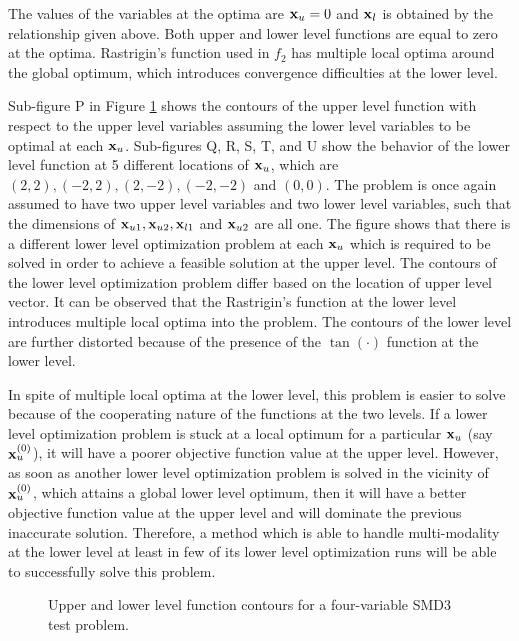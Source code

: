 \documentclass[twoside]{article}
\begin{document}
The values of the variables at the optima are $\mbox{$\mathbf{x}$}_u=0$ and $\mbox{$\mathbf{x}$}_l$ is obtained by the relationship given above. Both upper and lower level functions are equal to zero at the optima. Rastrigin's function used in $f_2$ has multiple local optima around the global optimum, which introduces convergence difficulties at the lower level.

Sub-figure P in Figure \ref{fig:smd3} shows the contours of the upper level function with respect to the upper level variables assuming the lower level variables to be optimal at each $\mbox{$\mathbf{x}$}_u$. Sub-figures Q, R, S, T, and U show the behavior of the lower level function at 5 different locations of $\mbox{$\mathbf{x}$}_u$, which are $(2,2), (-2,2), (2,-2), (-2,-2)$ and $(0,0)$. The problem is once again assumed to have two upper level variables and two lower level variables, such that the dimensions of $\mbox{$\mathbf{x}$}_{u1}, \mbox{$\mathbf{x}$}_{u2}, \mbox{$\mathbf{x}$}_{l1}$ and $\mbox{$\mathbf{x}$}_{u2}$ are all one. The figure shows that there is a different lower level optimization problem at each $\mbox{$\mathbf{x}$}_u$ which is required to be solved in order to achieve a feasible solution at the upper level. The contours of the lower level optimization problem differ based on the location of upper level vector. It can be observed that the Rastrigin's function at the lower level introduces multiple local optima into the problem. The contours of the lower level are further distorted because of the presence of the $\tan (\cdot)$ function at the lower level.

In spite of multiple local optima at the lower level, this problem is easier to solve because of the cooperating nature of the functions at the two levels. If a lower level optimization problem is stuck at a local optimum for a particular $\mbox{$\mathbf{x}$}_u$ (say $\mbox{$\mathbf{x}$}_{u}^{(0)}$), it will have a poorer objective function value at the upper level. However, as soon as another lower level optimization problem is solved in the vicinity of $\mbox{$\mathbf{x}$}_{u}^{(0)}$, which attains a global lower level optimum, then it will have a better objective function value at the upper level and will dominate the previous inaccurate solution. Therefore, a method which is able to handle multi-modality at the lower level at least in few of its lower level optimization runs will be able to successfully solve this problem.

\begin{figure}
\begin{center}
\caption{Upper and lower level function contours for a four-variable SMD3 test problem.}
\label{fig:smd3}
\end{center}
\end{figure}
\end{document}

